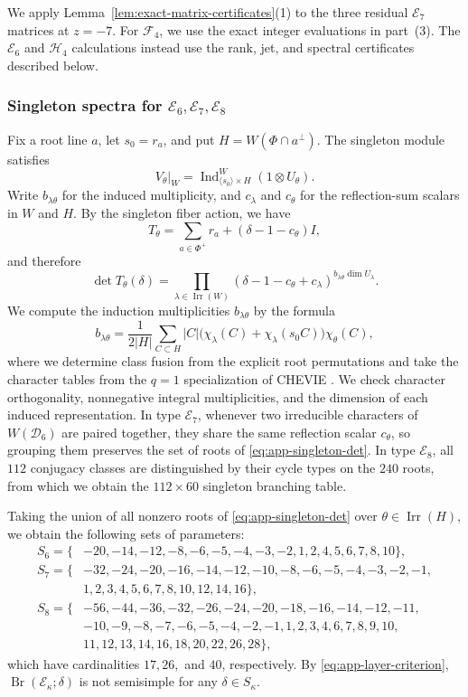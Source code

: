 \documentclass[11pt,a4paper]{amsart}
\newcommand{\Br}{\operatorname{Br}}\newcommand{\Irr}{\operatorname{Irr}}
\newcommand{\Ind}{\operatorname{Ind}}\newcommand{\Res}{\operatorname{Res}}
\theoremstyle{uprightdefinition}
\theoremstyle{remark}\newtheorem{remark}[theorem]{Remark}
\begin{document}
We apply Lemma~\ref{lem:exact-matrix-certificates}(1) to the three
residual $\mathscr{E}_7$ matrices at $z=-7$. For $\mathscr{F}_4$, we use the exact integer
evaluations in part~(3). The $\mathscr{E}_6$ and $\mathscr{H}_4$ calculations instead use
the rank, jet, and spectral certificates described below.

\subsubsection{Singleton spectra for \texorpdfstring{$\mathscr{E}_6,\mathscr{E}_7,\mathscr{E}_8$}{E6, E7, E8}}
\label{subsec:singleton-spectra}
Fix a root line $a$, let $s_0=r_a$, and put $H=W(\Phi\cap a^\perp)$.
The singleton module satisfies
\[
 V_\theta|_W=\Ind_{\langle s_0\rangle\times H}^{W}
       (1\otimes U_\theta).
\]
Write $b_{\lambda\theta}$ for the induced multiplicity, and $c_\lambda$
and $c_\theta$ for the reflection-sum scalars in $W$ and $H$.
By the singleton fiber action, we have
\[
 T_\theta=\sum_{a\in\Phi^+}r_a+(\delta-1-c_\theta)I,
\]
and therefore
\begin{equation}\label{eq:app-singleton-det}
 \det T_\theta(\delta)=
 \prod_{\lambda\in\Irr(W)}
   (\delta-1-c_\theta+c_\lambda)^{b_{\lambda\theta}\dim U_\lambda}.
\end{equation}
We compute the induction multiplicities $b_{\lambda\theta}$ by the formula
\[
 b_{\lambda\theta}=
 \frac1{2|H|}\sum_{C\subset H}|C|
  \bigl(\chi_\lambda(C)+\chi_\lambda(s_0C)\bigr)\chi_\theta(C),
\]
where we determine class fusion from the explicit root permutations
and take the character tables from the $q=1$ specialization of CHEVIE
\cite{CHEVIE}. We check character orthogonality, nonnegative integral
multiplicities, and the dimension of each induced representation.
In type $\mathscr{E}_7$, whenever two irreducible characters of $W(\mathscr{D}_6)$ are paired together, they share the same reflection scalar $c_\theta$, so grouping them preserves the set of roots of \eqref{eq:app-singleton-det}. In type $\mathscr{E}_8$, all $112$ conjugacy classes are distinguished by their cycle types on the $240$ roots, from which we obtain the $112\times60$ singleton branching table.

Taking the union of all nonzero roots of \eqref{eq:app-singleton-det} over $\theta\in\Irr(H)$, we obtain the following sets of parameters:
\begin{align*}
 S_6=\{&-20,-14,-12,-8,-6,-5,-4,-3,-2,1,2,4,5,6,7,8,10\},\\
 S_7=\{&-32,-24,-20,-16,-14,-12,-10,-8,-6,-5,-4,-3,-2,-1,\\
       &1,2,3,4,5,6,7,8,10,12,14,16\},\\
 S_8=\{&-56,-44,-36,-32,-26,-24,-20,-18,-16,-14,-12,-11,\\
       &-10,-9,-8,-7,-6,-5,-4,-2,-1,1,2,3,4,6,7,8,9,10,\\
       &11,12,13,14,16,18,20,22,26,28\},
\end{align*}
which have cardinalities $17,26,$ and $40$, respectively. By \eqref{eq:app-layer-criterion}, $\Br(\mathscr{E}_\kappa;\delta)$ is not semisimple for any $\delta\in S_\kappa$.
\end{document}
